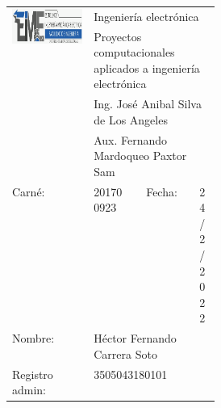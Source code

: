 \documentclass[12pt,letterpaper]{article}
\begin{document}

\begin{title}

\begin{table}[H]
\begin{center}
\begin{tabular}{|c|m{0.20\linewidth}|c|m{0.10\linewidth}|}
\multirow{4}{*}{\includegraphics[scale=0.3]{EIME.png}}                                                         & \multicolumn{3}{l}{Ingeniería electrónica}                                       \\
                                                                                & \multicolumn{3}{l}{Proyectos computacionales aplicados a ingeniería electrónica} \\
                                                                                & \multicolumn{3}{l}{Ing. José Anibal Silva de Los Angeles}                        \\
                                                                                & \multicolumn{3}{l}{Aux. Fernando Mardoqueo Paxtor Sam}                           \\ \hline 
	\multicolumn{1}{|l|}{Carné:} & 201700923 & Fecha: & \multicolumn{1}{l|}{24/2/2022}\\ 
	\hline 
	\multicolumn{1}{|l|}{Nombre:} & \multicolumn{3}{l|}{Héctor Fernando Carrera Soto} \\ 
	\hline 
	\multicolumn{1}{|l|}{Registro admin:} & \multicolumn{3}{l|}{3505043180101} \\ 
	\hline 
	\end{tabular} 
\end{center}
\end{table}

\end{title}

\end{document}
